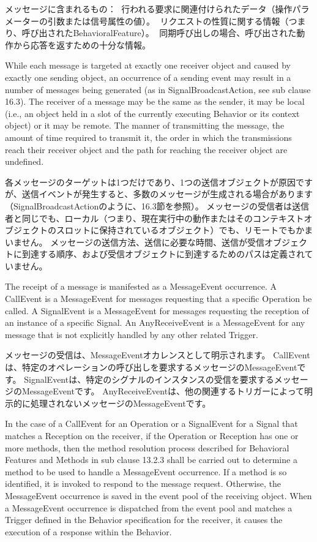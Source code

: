 \documentclass[a4paper,11pt]{ltjsarticle}
\begin{document}
メッセージに含まれるもの：
行われる要求に関連付けられたデータ（操作パラメーターの引数または信号属性の値）。
リクエストの性質に関する情報（つまり、呼び出されたBehavioralFeature）。
同期呼び出しの場合、呼び出された動作から応答を返すための十分な情報。

While each message is targeted at exactly one receiver object and caused by exactly one sending object, an occurrence of a sending event may result in a number of messages being generated (as in SignalBroadcastAction, see sub clause 16.3). 
The receiver of a message may be the same as the sender, it may be local (i.e., an object held in a slot of the currently executing Behavior or its context object) or it may be remote. 
The manner of transmitting the message, the amount of time required to transmit it, the order in which the transmissions reach their receiver object and the path for reaching the receiver object are undefined.

各メッセージのターゲットは1つだけであり、1つの送信オブジェクトが原因ですが、送信イベントが発生すると、多数のメッセージが生成される場合があります（SignalBroadcastActionのように、16.3節を参照）。
メッセージの受信者は送信者と同じでも、ローカル（つまり、現在実行中の動作またはそのコンテキストオブジェクトのスロットに保持されているオブジェクト）でも、リモートでもかまいません。
メッセージの送信方法、送信に必要な時間、送信が受信オブジェクトに到達する順序、および受信オブジェクトに到達するためのパスは定義されていません。

The receipt of a message is manifested as a MessageEvent occurrence. 
A CallEvent is a MessageEvent for messages requesting that a specific Operation be called. 
A SignalEvent is a MessageEvent for messages requesting the reception of an instance of a specific Signal. 
An AnyReceiveEvent is a MessageEvent for any message that is not explicitly handled by any other related Trigger.

メッセージの受信は、MessageEventオカレンスとして明示されます。
CallEventは、特定のオペレーションの呼び出しを要求するメッセージのMessageEventです。
SignalEventは、特定のシグナルのインスタンスの受信を要求するメッセージのMessageEventです。
AnyReceiveEventは、他の関連するトリガーによって明示的に処理されないメッセージのMessageEventです。

In the case of a CallEvent for an Operation or a SignalEvent for a Signal that matches a Reception on the receiver, if the Operation or Reception has one or more methods, then the method resolution process described for Behavioral Features and Methods in sub clause 13.2.3 shall be carried out to determine a method to be used to handle a MessageEvent occurrence. 
If a method is so identified, it is invoked to respond to the message request. 
Otherwise, the MessageEvent occurrence is saved in the event pool of the receiving object. 
When a MessageEvent occurrence is dispatched from the event pool and matches a Trigger defined in the Behavior specification for the receiver, it causes the execution of a response within the Behavior.
\end{document}
